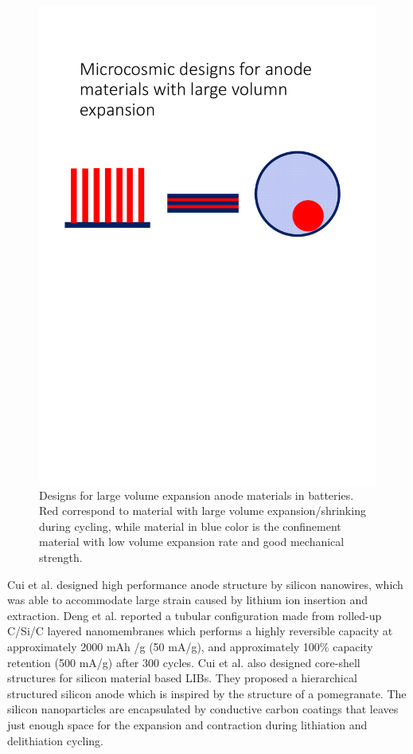 \begin{figure}  
\centering
\includegraphics[width=350pt]{figures/figure1_silibdesign}
\caption[Designs for large volume expansion anode materials]{Designs for large volume expansion anode materials in batteries. Red correspond to material with large volume expansion/shrinking during cycling, while material in blue color is the confinement material with low volume expansion rate and good mechanical strength. 
\label{fig:1silibdesign}}
\end{figure}

 Cui et al. designed high performance anode structure by silicon nanowires, which was able to accommodate large strain caused by lithium ion insertion and extraction.\cite{Cui2009} 
 Deng et al. reported a tubular configuration made from rolled-up C/Si/C layered nanomembranes which performs a highly reversible capacity at approximately 2000 mAh /g (50 mA/g), and approximately 100\% capacity retention (500 mA/g) after 300 cycles.\cite{Deng2013}
 Cui et al. also designed core-shell structures for silicon material based LIBs. They proposed a hierarchical structured silicon anode which is inspired by the structure of a pomegranate. The silicon nanoparticles are encapsulated by conductive carbon coatings that leaves just enough space for the expansion and contraction during lithiation and delithiation cycling. \cite{Liu2014d}
 
